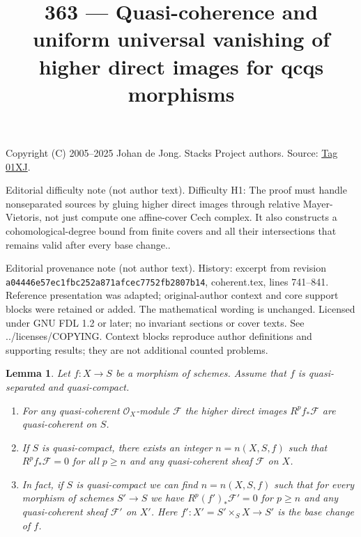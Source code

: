 \documentclass{amsart}
\theoremstyle{plain}
\newtheorem{lemma}[subsection]{Lemma}
\theoremstyle{definition}
\theoremstyle{remark}
\numberwithin{equation}{subsection}
\begin{document}
\title[Stacks Project, Tag 01XJ]{363 --- Quasi-coherence and uniform universal vanishing of higher direct images for qcqs morphisms}
\maketitle
\noindent Copyright (C) 2005--2025 Johan de Jong. Stacks Project authors. Source: \href{https://stacks.math.columbia.edu/tag/01XJ}{Tag 01XJ}.

\noindent Editorial difficulty note (not author text). Difficulty H1: The proof must handle nonseparated sources by gluing higher direct images through relative Mayer-Vietoris, not just compute one affine-cover Cech complex. It also constructs a cohomological-degree bound from finite covers and all their intersections that remains valid after every base change..

\noindent Editorial provenance note (not author text). History: excerpt from revision \texttt{a0444\allowbreak 6e57e\allowbreak c1fbc\allowbreak 252a8\allowbreak 71afc\allowbreak ec775\allowbreak 2fb28\allowbreak 07b14}, coherent.tex, lines 741--841. Reference presentation was adapted; original-author context and core support blocks were retained or added. The mathematical wording is unchanged. Licensed under GNU FDL 1.2 or later; no invariant sections or cover texts. See ../licenses/COPYING. Context blocks reproduce author definitions and supporting results; they are not additional counted problems.

\begin{lemma}
\label{lemma-quasi-coherence-higher-direct-images}
Let $f : X \to S$ be a morphism of schemes.
Assume that $f$ is quasi-separated and quasi-compact.
\begin{enumerate}
\item For any quasi-coherent $\mathcal{O}_X$-module $\mathcal{F}$ the
higher direct images $R^pf_*\mathcal{F}$ are quasi-coherent on $S$.
\item If $S$ is quasi-compact, there exists an integer $n = n(X, S, f)$
such that $R^pf_*\mathcal{F} = 0$ for all $p \geq n$ and any
quasi-coherent sheaf $\mathcal{F}$ on $X$.
\item In fact, if $S$ is quasi-compact we can find $n = n(X, S, f)$
such that for every
morphism of schemes $S' \to S$ we have $R^p(f')_*\mathcal{F}' = 0$
for $p \geq n$ and any quasi-coherent sheaf $\mathcal{F}'$
on $X'$. Here $f' : X' = S' \times_S X \to S'$ is the base change of $f$.
\end{enumerate}
\end{lemma}
\end{document}

